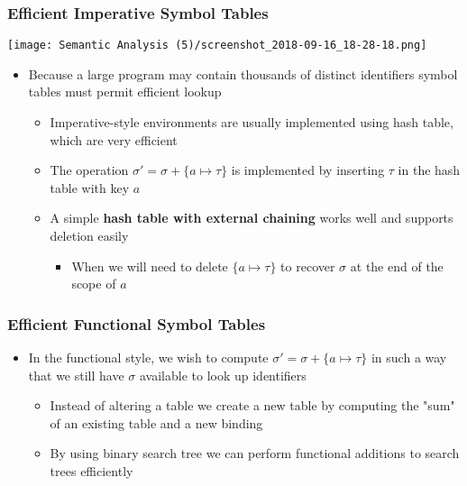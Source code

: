 \documentclass[11pt]{article}
\begin{document}
\subsubsection{Efficient Imperative Symbol Tables}
\label{sec:orgcb0fd90}
\begin{center}
\texttt{[image: Semantic Analysis (5)/screenshot\_2018-09-16\_18-28-18.png]}
\end{center}

\begin{itemize}
\item Because a large program may contain thousands of distinct identifiers symbol tables must permit efficient lookup
\begin{itemize}
\item Imperative-style environments are usually implemented using hash table, which are very efficient
\item The operation \(\sigma' = \sigma + \{a \mapsto \tau \}\) is implemented by inserting \(\tau\) in the hash table with key \(a\)
\item A simple \textbf{hash table with external chaining} works well and supports deletion easily
\begin{itemize}
\item When we will need to delete \(\{a \mapsto \tau \}\) to recover \(\sigma\) at the end of the scope of \(a\)
\end{itemize}
\end{itemize}
\end{itemize}

\subsubsection{Efficient Functional Symbol Tables}
\label{sec:orgd6fce72}
\begin{itemize}
\item In the functional style, we wish to compute \(\sigma' = \sigma + \{a \mapsto \tau\}\) in such a way that we still have \(\sigma\) available to look up identifiers
\begin{itemize}
\item Instead of altering a table we create a new table by computing the "sum" of an existing table and a new binding
\item By using binary search tree we can perform functional additions to search trees efficiently
\end{itemize}
\end{itemize}
\end{document}
